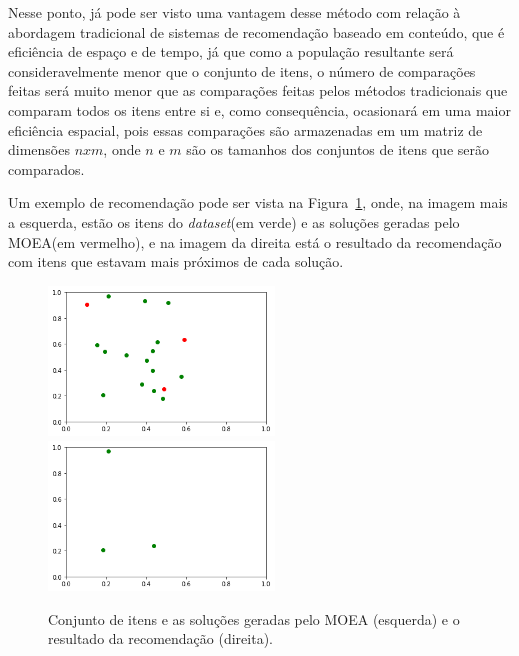 Nesse ponto, já pode ser visto uma vantagem desse método com relação à abordagem tradicional de sistemas de recomendação baseado em conteúdo, que é eficiência de espaço e de tempo, já que como a população resultante será consideravelmente menor que o conjunto de itens, o número de comparações feitas será muito menor que as comparações feitas pelos métodos tradicionais que comparam todos os itens entre si e, como consequência, ocasionará em uma maior eficiência espacial, pois essas comparações são armazenadas em um matriz de  dimensões \(n x m\), onde \(n\) e \(m\) são os tamanhos dos conjuntos de itens que serão comparados.

Um exemplo de recomendação pode ser vista na Figura~\ref{fig:solucoes_itens}, onde, na imagem mais a esquerda, estão os itens do \textit{dataset}(em verde) e as soluções geradas pelo MOEA(em vermelho), e na imagem da direita está o resultado da recomendação com itens que estavam mais próximos de cada solução.

\begin{figure}[!h]
   
    \centering
    \includegraphics[width=6cm]{Imagens/solucoes-itens.png}
    \includegraphics[width=6cm]{Imagens/recommender_item.png}
   \caption{Conjunto de itens e as soluções geradas pelo MOEA (esquerda) e o resultado da recomendação (direita).}
    \label{fig:solucoes_itens}
    
\end{figure}




        